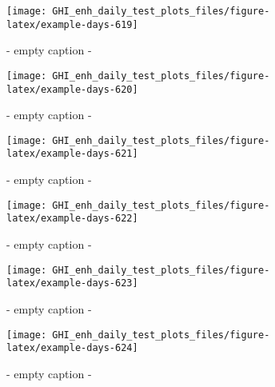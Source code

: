 \documentclass[
  10pt,
  a4paper,oneside]{article}
\begin{document}
\begin{figure}[H]

{\centering \texttt{[image: GHI\_enh\_daily\_test\_plots\_files/figure-latex/example-days-619]} 

}

\caption{ - empty caption - }\label{fig:example-days-619}
\end{figure}

\begin{figure}[H]

{\centering \texttt{[image: GHI\_enh\_daily\_test\_plots\_files/figure-latex/example-days-620]} 

}

\caption{ - empty caption - }\label{fig:example-days-620}
\end{figure}

\begin{figure}[H]

{\centering \texttt{[image: GHI\_enh\_daily\_test\_plots\_files/figure-latex/example-days-621]} 

}

\caption{ - empty caption - }\label{fig:example-days-621}
\end{figure}

\begin{figure}[H]

{\centering \texttt{[image: GHI\_enh\_daily\_test\_plots\_files/figure-latex/example-days-622]} 

}

\caption{ - empty caption - }\label{fig:example-days-622}
\end{figure}

\begin{figure}[H]

{\centering \texttt{[image: GHI\_enh\_daily\_test\_plots\_files/figure-latex/example-days-623]} 

}

\caption{ - empty caption - }\label{fig:example-days-623}
\end{figure}

\begin{figure}[H]

{\centering \texttt{[image: GHI\_enh\_daily\_test\_plots\_files/figure-latex/example-days-624]} 

}

\caption{ - empty caption - }\label{fig:example-days-624}
\end{figure}
\end{document}
